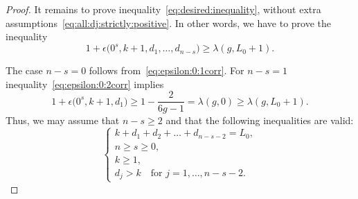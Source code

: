 \begin{proof}
It remains to prove inequality~\eqref{eq:desired:inequality},
without extra assumptions~\eqref{eq:all:dj:strictly:positive}.
In other words, we have to prove the inequality
\[
1+\epsilon\big(0^s,k+1,d_1,\dots,d_{n-s}\big)\ge \lambda(g,L_0+1) .
\]

The case $n-s=0$ follows from~\eqref{eq:epsilon:0:1corr}. For $n-s=1$ inequality~\eqref{eq:epsilon:0:2corr} implies
\[
1+\epsilon\big(0^s,k+1,d_1\big)\ge 1-\frac{2}{6g-1} =\lambda(g,0) \ge \lambda(g,L_0+1) .
\]
Thus, we may assume that $n-s\ge 2$ and that the following inequalities are valid:
\[
\begin{cases}
k+d_1+d_2+\dots+d_{n-s-2}=L_0 ,
\\ n\ge s\ge 0 ,
\\ k\ge 1 ,
\\ d_j> k\quad\text{for }j=1,\dots,n-s-2 .
\end{cases}
\]


\end{proof}
